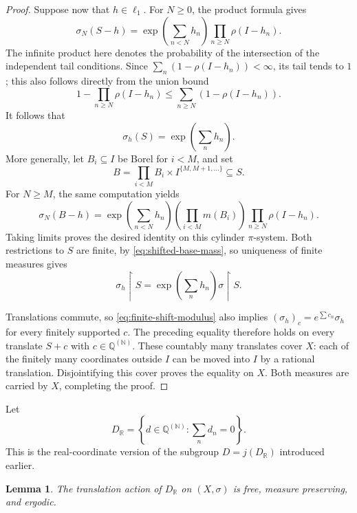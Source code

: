 \documentclass[11pt]{article}
\newtheorem{lemma}[theorem]{Lemma}
\theoremstyle{definition}
\newcommand{\N}{\mathbb N}
\newcommand{\R}{\mathbb R}
\newcommand{\Q}{\mathbb Q}
\begin{document}
\begin{proof}
Suppose now that $h\in\ell_1$. For $N\geq0$, the product formula gives
\[
 \sigma_N(S-h)
   =\exp\!\left(\sum_{n<N}h_n\right)
        \prod_{n\geq N}\rho(I-h_n).
\]
The infinite product here denotes the probability of the intersection
of the independent tail conditions. Since
$\sum_n(1-\rho(I-h_n))<\infty$, its tail tends to $1$; this also follows
directly from the union bound
\[
 1-\prod_{n\geq N}\rho(I-h_n)
       \leq\sum_{n\geq N}(1-\rho(I-h_n)).
\]
It follows that
\begin{equation}
 \sigma_h(S)=\exp\!\left(\sum_n h_n\right).
 \label{eq:shifted-base-mass}
\end{equation}
More generally, let $B_i\subseteq I$ be Borel for $i<M$, and set
\[
 B=\prod_{i<M}B_i\times I^{\{M,M+1,\ldots\}}\subseteq S.
\]
For $N\geq M$, the same computation yields
\[
 \sigma_N(B-h)=
 \exp\!\left(\sum_{n<N}h_n\right)
 \left(\prod_{i<M}m(B_i)\right)
 \prod_{n\geq N}\rho(I-h_n).
\]
Taking limits proves the desired identity on this cylinder
$\pi$-system. Both restrictions to $S$ are finite, by
\eqref{eq:shifted-base-mass}, so uniqueness of finite measures gives
\[
 \sigma_h\mathbin{\upharpoonright}S
   =\exp\!\left(\sum_n h_n\right)
       \sigma\mathbin{\upharpoonright}S.
\]

Translations commute, so \eqref{eq:finite-shift-modulus} also implies
$(\sigma_h)_c=e^{\sum c_n}\sigma_h$ for every finitely supported $c$.
The preceding equality therefore holds on every translate $S+c$ with
$c\in\Q^{(\N)}$. These countably many translates cover $X$: each of
the finitely many coordinates outside $I$ can be moved into $I$ by a
rational translation. Disjointifying this cover proves the equality
on $X$. Both measures are carried by $X$, completing the proof.
\end{proof}

Let
\[
 D_{\R}=\left\{d\in\Q^{(\N)}:\sum_n d_n=0\right\}.
\]
This is the real-coordinate version of the subgroup $D=j(D_{\R})$
introduced earlier.

\begin{lemma}
\label{lem:restricted-ergodicity}
The translation action of $D_{\R}$ on $(X,\sigma)$ is free, measure
preserving, and ergodic.
\end{lemma}
\end{document}
